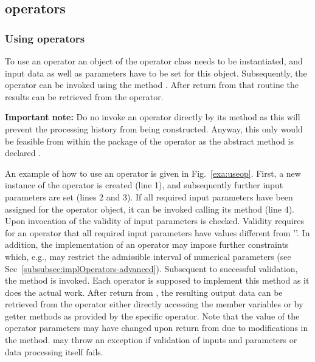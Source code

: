 \subsection{\alida operators}
\label{subsec:operators-programming}

\subsubsection{Using operators}
\label{subsec:using}
To use an operator an object of the operator class needs to be instantiated,
and input data as well as parameters have to be set for this object.
Subsequently, the operator can be invoked using the method
.
After return from that routine the results can be retrieved from the operator.

\textbf{Important note:} Do no invoke an operator directly by its  method
as this will prevent the processing history from being constructed.
Anyway, this only would be feasible from within the package of the operator
as the abstract method  is declared .

An example of how to use an operator is given in Fig.~\ref{exa:useop}.
First, a new instance of the operator is created (line 1), and subsequently
further input parameters are set (lines 2 and 3).
If all required input parameters have been assigned for the operator object,
it can be invoked calling its  method (line 4). 
Upon invocation of   the validity of input parameters is checked. 
Validity requires for an operator that all required input parameters
have values different from ''.
In addition, the implementation of an operator may impose further constraints
which, e.g., may restrict the admissible interval of numerical parameters
(see Sec~\ref{subsubsec:implOperators-advanced}).
Subsequent to successful validation, the method 
is invoked. Each operator is supposed to implement this method as it does the
actual work. After return from , the
resulting output data can be retrieved from the operator either directly accessing the member
variables or by getter methods as provided by the specific operator.
Note that the value of the operator parameters may
have changed upon return from  due 
to modifications in the  method.
 may throw an exception if validation of inputs and parameters or
data processing itself fails.\\

